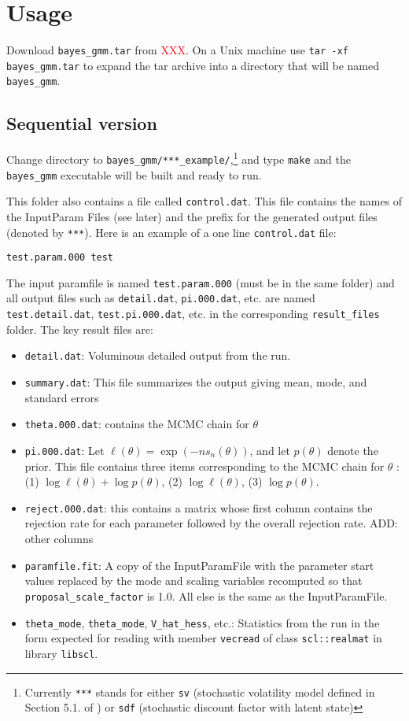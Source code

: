 \documentclass[11pt, letterpaper, notitlepage]{article}
\begin{document}
\pagebreak

\section{Usage}

Download \texttt{bayes\_gmm.tar} from \textcolor{red}{XXX}. On a Unix machine use \texttt{tar -xf bayes\_gmm.tar} to expand the tar archive into a directory that will be named \texttt{bayes\_gmm}.

\subsection{Sequential version}

Change directory to \texttt{bayes\_gmm/***\_example/},\footnote{Currently \texttt{***} stands for either \texttt{sv} (stochastic volatility model defined in Section 5.1. of \cite{GGR_2017}) or \texttt{sdf} (stochastic discount factor with latent state)} and type \texttt{make} and  the \texttt{bayes\_gmm} executable will be built and ready to run.

This folder also contains a file called \texttt{control.dat}. This file contains the names of the InputParam Files (see later) and the prefix for the generated output files (denoted by \texttt{***}). Here is an example of a one line \texttt{control.dat} file:

\texttt{test.param.000 test}

The input paramfile is named \texttt{test.param.000} (must be in the same folder) and all output files such as \texttt{detail.dat},
\texttt{pi.000.dat}, etc. are named \texttt{test.detail.dat}, \texttt{test.pi.000.dat}, etc. in the corresponding \texttt{result\_files} folder. The key result files are:
\begin{itemize}
\item \texttt{detail.dat}: Voluminous detailed output from the run.
\item \texttt{summary.dat}: This file summarizes the output giving mean, mode, and standard errors
\item \texttt{theta.000.dat}: contains
the MCMC chain for $\theta$ 
\item \texttt{pi.000.dat}: Let $\ell(\theta) = \exp(-n s_n(\theta))$, and let $p(\theta)$ denote the prior. This file contains three items corresponding to the MCMC chain for $\theta$ :
(1) $\log \ell(\theta) + \log p(\theta)$, (2) $\log \ell(\theta)$, (3) $\log p(\theta)$.
\item \texttt{reject.000.dat}: this contains a matrix whose first column contains the rejection rate for each parameter followed by the overall rejection rate. ADD: other columns
\item \texttt{paramfile.fit}: A copy of the InputParamFile with the parameter start values replaced by the mode and scaling variables recomputed so that \texttt{proposal\_scale\_factor} is 1.0. All else is the same as the InputParamFile.
\item \texttt{theta\_mode}, \texttt{theta\_mode}, \texttt{V\_hat\_hess}, etc.: Statistics from the run in the form expected for reading with member \texttt{vecread} of class \texttt{scl::realmat} in library \texttt{libscl}.
\end{itemize}
\end{document}
